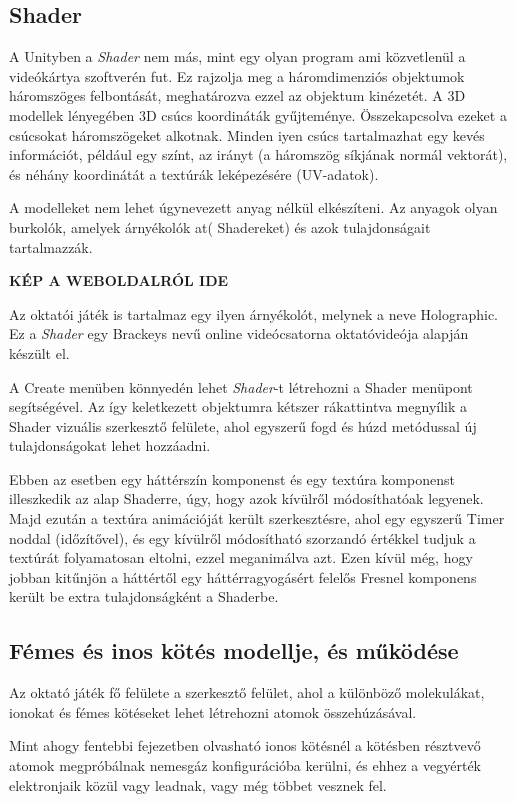\documentclass[colorlinks]{thesis-ekf}
\theoremstyle{definition}
\theoremstyle{remark}
\begin{document}
\subsection{Shader}
A Unityben a \textit{Shader} nem más, mint egy olyan program ami közvetlenül a videókártya szoftverén fut. Ez rajzolja meg a háromdimenziós objektumok háromszöges felbontását, meghatározva ezzel az objektum kinézetét. A 3D modellek lényegében 3D csúcs koordináták gyűjteménye. Összekapcsolva ezeket a csúcsokat háromszögeket alkotnak. Minden iyen csúcs tartalmazhat egy kevés információt, például egy színt, az irányt (a háromszög síkjának normál vektorát), és néhány koordinátát a textúrák leképezésére (UV-adatok).

A modelleket nem lehet  úgynevezett anyag nélkül elkészíteni. Az anyagok olyan burkolók, amelyek árnyékolók at( Shadereket) és azok tulajdonságait tartalmazzák. \cite{unity_shader}

\textbf{KÉP A WEBOLDALRÓL IDE}

Az oktatói játék is tartalmaz egy ilyen árnyékolót, melynek a neve Holographic. Ez a \textit{Shader} egy Brackeys nevű online videócsatorna oktatóvideója alapján készült el. \cite{youtube_shader}

A Create menüben könnyedén lehet \textit{Shader}-t létrehozni a Shader menüpont segítségével. Az így keletkezett objektumra kétszer rákattintva megnyílik a Shader vizuális szerkesztő felülete, ahol egyszerű fogd és húzd metódussal új tulajdonságokat lehet hozzáadni. 

Ebben az esetben egy háttérszín komponenst és egy textúra komponenst illeszkedik az alap Shaderre, úgy, hogy azok kívülről módosíthatóak legyenek. Majd ezután a textúra animációját került szerkesztésre, ahol egy egyszerű Timer noddal (időzítővel), és egy kívülről módosítható szorzandó értékkel tudjuk a textúrát folyamatosan eltolni, ezzel meganimálva azt. Ezen kívül még, hogy jobban kitűnjön a háttértől egy háttérragyogásért felelős Fresnel komponens került be extra tulajdonságként a Shaderbe.
\subsection{Fémes és inos kötés modellje, és működése}
Az oktató játék fő felülete a szerkesztő felület, ahol a különböző molekulákat, ionokat és fémes kötéseket lehet létrehozni atomok összehúzásával.

Mint ahogy fentebbi fejezetben olvasható ionos kötésnél a kötésben résztvevő atomok megpróbálnak nemesgáz konfigurációba kerülni, és ehhez a vegyérték elektronjaik közül vagy leadnak, vagy még többet vesznek fel.
\end{document}
